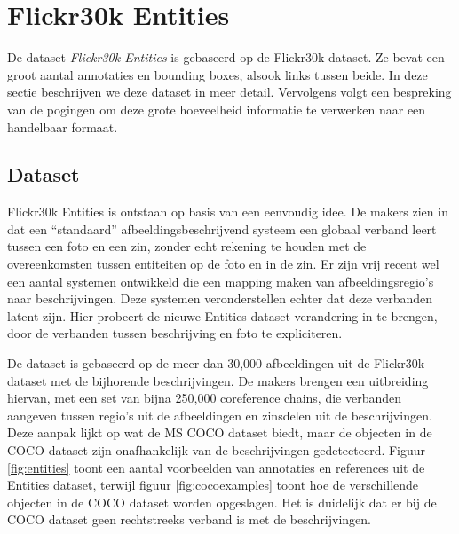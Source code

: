 \section{Flickr30k Entities}
De dataset \emph{Flickr30k Entities}\cite{Plummer2015} is gebaseerd op de Flickr30k dataset. Ze bevat een groot aantal annotaties en bounding boxes, alsook links tussen beide. In deze sectie beschrijven we deze dataset in meer detail. Vervolgens volgt een bespreking van de pogingen om deze grote hoeveelheid informatie te verwerken naar een handelbaar formaat.

\subsection{Dataset}
\label{sub:Dataset}
Flickr30k Entities is ontstaan op basis van een eenvoudig idee. De makers zien in dat een ``standaard'' afbeeldingsbeschrijvend systeem een globaal verband leert tussen een foto en een zin, zonder echt rekening te houden met de overeenkomsten tussen entiteiten op de foto en in de zin. Er zijn vrij recent wel een aantal systemen ontwikkeld die een mapping maken van afbeeldingsregio's naar beschrijvingen. Deze systemen veronderstellen echter dat deze verbanden latent zijn. Hier probeert de nieuwe Entities dataset verandering in te brengen, door de verbanden tussen beschrijving en foto te expliciteren.

De dataset is gebaseerd op de meer dan 30,000 afbeeldingen uit de Flickr30k\cite{Young2014} dataset met de bijhorende beschrijvingen. De makers brengen een uitbreiding hiervan, met een set van bijna 250,000 coreference chains, die verbanden aangeven tussen regio's uit de afbeeldingen en zinsdelen uit de beschrijvingen. Deze aanpak lijkt op wat de MS COCO\cite{Lin2014} dataset biedt, maar de objecten in de COCO dataset zijn onafhankelijk van de beschrijvingen gedetecteerd. Figuur \ref{fig:entities} toont een aantal voorbeelden van annotaties en references uit de Entities dataset, terwijl figuur \ref{fig:cocoexamples} toont hoe de verschillende objecten in de COCO dataset worden opgeslagen. Het is duidelijk dat er bij de COCO dataset geen rechtstreeks verband is met de beschrijvingen. 

